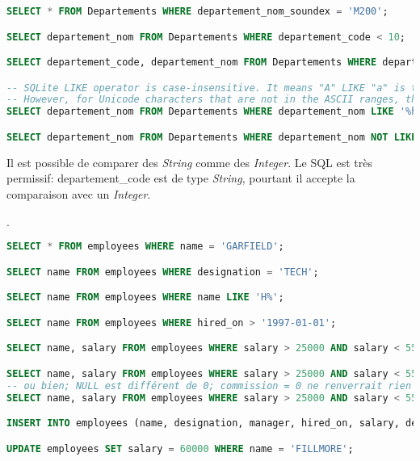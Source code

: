 \documentclass[a4paper,11pt]{article}
\begin{document}
\begin{Form}
\begin{exo}
\begin{enumerate}
\begin{center}
\begin{lstlisting}[language=SQL]
SELECT * FROM Departements WHERE departement_nom_soundex = 'M200';

SELECT departement_nom FROM Departements WHERE departement_code < 10;

SELECT departement_code, departement_nom FROM Departements WHERE departement_code > 20 AND departement_code < 30;

-- SQLite LIKE operator is case-insensitive. It means "A" LIKE "a" is true.
-- However, for Unicode characters that are not in the ASCII ranges, the LIKE operator is case sensitive e.g., "Ä" LIKE "ä" is false
SELECT departement_nom FROM Departements WHERE departement_nom LIKE '%haut%';

SELECT departement_nom FROM Departements WHERE departement_nom NOT LIKE '%-%' AND departement_nom NOT LIKE '% %';
\end{lstlisting}
\label{moncode}
\end{center}
\begin{aretenir}[Remarque]
Il est possible de comparer des \emph{String} comme des \emph{Integer}. Le SQL est très permissif: departement\_code est de type \emph{String}, pourtant il accepte la comparaison avec un \emph{Integer}.
\end{aretenir}
\end{enumerate}.
\end{exo}
\begin{exo}
\begin{center}
\begin{lstlisting}[language=SQL]
SELECT * FROM employees WHERE name = 'GARFIELD';

SELECT name FROM employees WHERE designation = 'TECH';

SELECT name FROM employees WHERE name LIKE 'H%';

SELECT name FROM employees WHERE hired_on > '1997-01-01';

SELECT name, salary FROM employees WHERE salary > 25000 AND salary < 55000;

SELECT name, salary FROM employees WHERE salary > 25000 AND salary < 55000 AND commission IS NOT NULL;
-- ou bien; NULL est différent de 0; commission = 0 ne renverrait rien ici
SELECT name, salary FROM employees WHERE salary > 25000 AND salary < 55000 AND commission > 0;

INSERT INTO employees (name, designation, manager, hired_on, salary, dept) VALUES ('DURAN', 'TECH', 6, '1999-01-13', 35000, 4);

UPDATE employees SET salary = 60000 WHERE name = 'FILLMORE';
\end{lstlisting}
\label{moncode}
\end{center}
\end{exo}
\end{Form}
\end{document}
